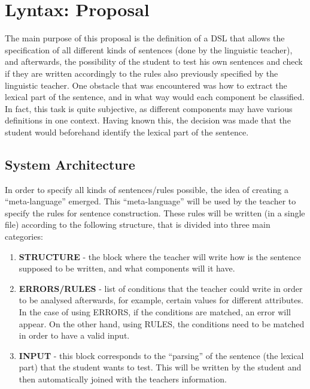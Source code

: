 \chapter{Lyntax: Proposal} \label{lyntax_proposal}

The main purpose of this proposal is the definition of a \textsc{DSL} that allows the specification of all different kinds of sentences (done by the linguistic teacher), and afterwards, the possibility of the student to test his own sentences and check if they are written accordingly to the rules also previously specified by the linguistic teacher. One obstacle that was encountered was how to extract the lexical part of the sentence, and in what way would each component be classified. In fact, this task is quite subjective, as different components may have various definitions in one context. %
Having known this, the decision was made that the student would beforehand identify the lexical part of the sentence.


\section{System Architecture}
In order to specify all kinds of sentences/rules possible, the idea of creating a ``meta-language'' emerged. This ``meta-language'' will be used by the teacher to specify the rules for sentence construction. 
These rules will be written (in a single file) according to the following structure, that is divided into three main categories:

\begin{enumerate}
    \item \textbf{STRUCTURE} - the block where the teacher will write how is the sentence supposed to be written, and what components will it have.
    
    \item \textbf{ERRORS/RULES} - list of conditions that the teacher could write in order to be analysed afterwards, for example, certain values for different attributes. 
In the case of using ERRORS, if the conditions are matched, an error will appear. 
On the other hand, using RULES, the conditions need to be matched in order to have a valid input.
    
    \item \textbf{INPUT} - this block corresponds to the ``parsing'' of the sentence (the lexical part) that the student wants to test. This will be written by the student and then automatically joined with the teachers information.
\end{enumerate}

